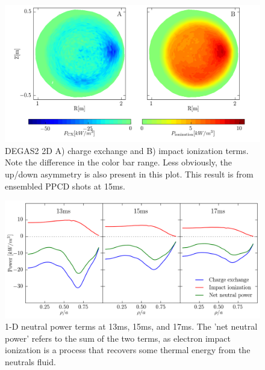 \begin{figure}
    \centering
    \includegraphics[width=\linewidth]{ion_transport_results/DEGAS2_power_terms_2d.png}
    \caption{DEGAS2 2D  A) charge exchange and B) impact ionization terms. Note the difference in the color bar range. Less obviously, the up/down asymmetry is also present in this plot. This result is from ensembled PPCD shots at 15ms.}
    \label{fig:DEGAS2_power_2d}
\end{figure}

\begin{figure}
    \centering
    \includegraphics{ion_transport_results/DEGAS2_power_terms_1d.png}
    \caption{1-D neutral power terms at 13ms, 15ms, and 17ms. The 'net neutral power' refers to the sum of the two terms, as electron impact ionization is a process that recovers some thermal energy from the neutrals fluid.}
    \label{fig:DEGAS2_power_1d}
\end{figure}


